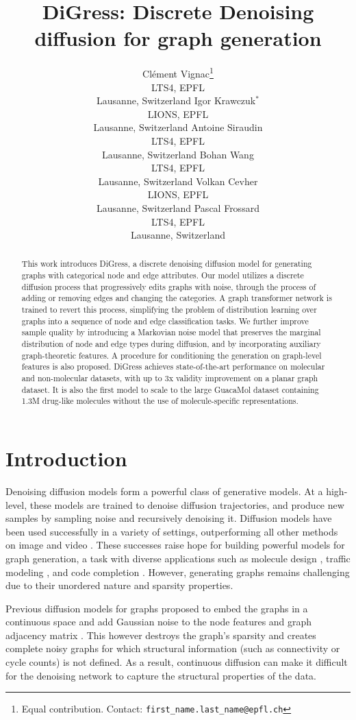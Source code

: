 \documentclass{article} %
\title{DiGress: Discrete Denoising diffusion for graph generation}
\author{Clément Vignac\thanks{Equal contribution. Contact: \texttt{first\_name.last\_name@epfl.ch}} \\ LTS4, EPFL \\ Lausanne, Switzerland
\And Igor Krawczuk$^*$ \\ LIONS, EPFL \\ Lausanne, Switzerland
\And Antoine Siraudin \\ LTS4, EPFL \\ Lausanne, Switzerland
\And Bohan Wang \\ LTS4, EPFL \\ Lausanne, Switzerland
\And Volkan Cevher \\ LIONS, EPFL \\ Lausanne, Switzerland
\And Pascal Frossard \\ LTS4, EPFL \\ Lausanne, Switzerland}
\theoremstyle{plain}
\theoremstyle{definition}
\theoremstyle{remark}
\begin{document}

\maketitle

\begin{abstract}
This work introduces DiGress, a discrete denoising diffusion model for generating graphs with categorical node and edge attributes.
Our model utilizes a discrete diffusion process that progressively edits graphs with noise, through the process of adding or removing edges and changing the categories.
A graph transformer network is trained to revert this process, simplifying the problem of distribution learning over graphs into a sequence of node and edge classification tasks.
We further improve sample quality by introducing a Markovian noise model that preserves the marginal distribution of node and edge types during diffusion, and by incorporating auxiliary graph-theoretic features.
A procedure for conditioning the generation on graph-level features is also proposed.
DiGress achieves state-of-the-art performance on molecular and non-molecular datasets, with up to 3x validity improvement on a planar graph dataset. 
It is also the first model to scale to the large GuacaMol dataset containing 1.3M drug-like molecules without the use of molecule-specific representations.
\end{abstract}

\section{Introduction}

Denoising diffusion models \citep{sohldickstein2015diffusion, ho2020denoising} form a powerful class of generative models. At a high-level, these models are trained to denoise diffusion trajectories, and produce new samples by sampling noise and recursively denoising it.
Diffusion models have been used successfully in a variety of settings, outperforming all other methods on image and video \citep{dhariwal2021diffusion, ho2022video}.
These successes raise hope for building powerful models for graph generation, a task with diverse applications such as molecule design \citep{liu2018constrained}, traffic modeling \citep{yu2019real}, and code completion \citep{Brockschmidt2018}. However, generating graphs remains challenging due to their unordered nature and sparsity properties.

Previous diffusion models for graphs proposed to embed the graphs in a continuous space and add Gaussian noise to the node features and graph adjacency matrix \citep{niu2020permutation, jo2022score}. 
This however destroys the graph's sparsity and creates complete noisy graphs for which structural information (such as connectivity or cycle counts) is not defined. 
As a result, continuous diffusion can make it difficult for the denoising network to capture the structural properties of the data.
\end{document}
